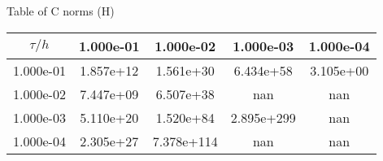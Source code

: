 \begin{center}
Table of C norms (H)
\\[2.0ex]  
  
\begin{tabular}{|c|c|c|c|c|} \hline
$\tau / h$ &1.000e-01 &1.000e-02 &1.000e-03 &1.000e-04 \\ \hline 
1.000e-01 &1.857e+12 &1.561e+30 &6.434e+58 &3.105e+00 \\ \hline 
1.000e-02 &7.447e+09 &6.507e+38 &nan &nan \\ \hline 
1.000e-03 &5.110e+20 &1.520e+84 &2.895e+299 &nan \\ \hline 
1.000e-04 &2.305e+27 &7.378e+114 &nan &nan \\ \hline 

\end{tabular}\\[20pt]
\end{center}
